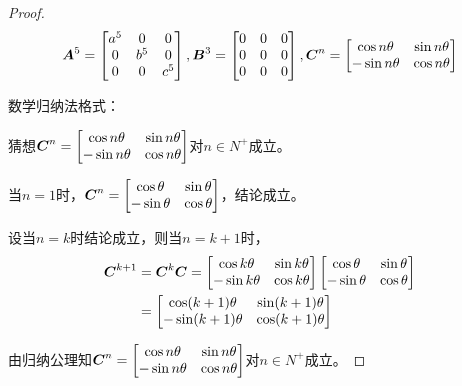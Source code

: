 \documentclass{ctexart}
\begin{document}
\begin{proof}
    \begin{equation*}
\boldsymbol{A}^5=\begin{bmatrix}a^5&0&0\\0&b^5&0\\0&0&c^5\end{bmatrix},\boldsymbol{B}^3=\begin{bmatrix}0&0&0\\0&0&0\\0&0&0\end{bmatrix},\boldsymbol{C}^n=\begin{bmatrix}\cos n\theta&\sin n\theta\\-\sin n\theta&\cos n\theta\end{bmatrix}
    \end{equation*}

    数学归纳法格式：

    猜想\(\boldsymbol{C}^n=\begin{bmatrix}\cos n\theta&\sin n\theta\\-\sin n\theta&\cos n\theta\end{bmatrix}\)对\(n\in N^+\)成立。

    当\(n=1\)时，\(\boldsymbol{C}^n=\begin{bmatrix}\cos \theta&\sin \theta\\-\sin \theta&\cos \theta\end{bmatrix}\)，结论成立。

    设当\(n=k\)时结论成立，则当\(n=k+1\)时，
    \begin{align*}
        \boldsymbol{C}^{k+1} & =\boldsymbol{C}^k\boldsymbol{C}=\begin{bmatrix}\cos k\theta&\sin k\theta\\-\sin k\theta&\cos k\theta\end{bmatrix}\begin{bmatrix}\cos \theta&\sin \theta\\-\sin \theta&\cos \theta\end{bmatrix} \\
                    & =\begin{bmatrix}\cos (k+1)\theta&\sin (k+1)\theta\\-\sin (k+1)\theta&\cos (k+1)\theta\end{bmatrix}
    \end{align*}

    由归纳公理知\(\boldsymbol{C}^n=\begin{bmatrix}\cos n\theta&\sin n\theta\\-\sin n\theta&\cos n\theta\end{bmatrix}\)对\(n\in N^+\)成立。
\end{proof}
\end{document}
